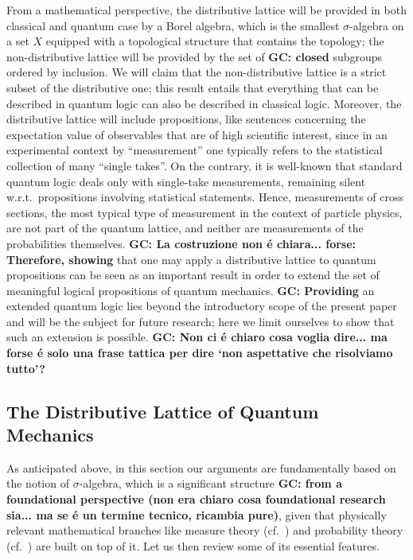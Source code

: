 \documentclass[11pt, executivepaper]{article}
\begin{document}
From a mathematical perspective, the distributive lattice will be provided in both classical and quantum case by a Borel algebra, which is the smallest $\sigma$-algebra on a set $X$ equipped with a topological structure that contains the topology; the non-distributive lattice will be provided by the set of \textbf{GC: closed} subgroups ordered by inclusion. We will claim that the non-distributive lattice is a strict subset of the distributive one; this result entails that everything that can be described in quantum logic can also be described in classical logic. Moreover, the distributive lattice will include propositions, like sentences concerning the expectation value of observables that are of high scientific interest, since in an experimental context by ``measurement'' one typically refers to the statistical collection of many ``single takes''. On the contrary, it is well-known that standard quantum logic deals only with single-take measurements, remaining silent w.r.t.\ propositions involving statistical statements. Hence, measurements of cross sections, the most typical type of measurement in the context of particle physics, are not part of the quantum lattice, and neither are measurements of the probabilities themselves. \textbf{GC: La costruzione non \'e chiara... forse: Therefore, showing} that one may apply a distributive lattice to quantum propositions can be seen as an important result in order to extend the set of meaningful logical propositions of quantum mechanics. \textbf{GC: Providing} an extended quantum logic lies beyond the introductory scope of the present paper and will be the subject for future research; here we limit ourselves to show that such an extension is possible. \textbf{GC: Non ci \'e chiaro cosa voglia dire... ma forse \'e solo una frase tattica per dire `non aspettative che risolviamo tutto'?}

\subsection{The Distributive Lattice of Quantum Mechanics}

As anticipated above, in this section our arguments are fundamentally based on the notion of $\sigma$-algebra, which is a significant structure \textbf{GC: from a foundational perspective (non era chiaro cosa foundational research sia... ma se \'e un termine tecnico, ricambia pure)}, given that physically relevant mathematical branches like measure theory (cf.\ \cite{Cohn:2013}) and probability theory (cf.\ \cite{Grimmett:2001}) are built on top of it. Let us then review some of its essential features.
\end{document}
